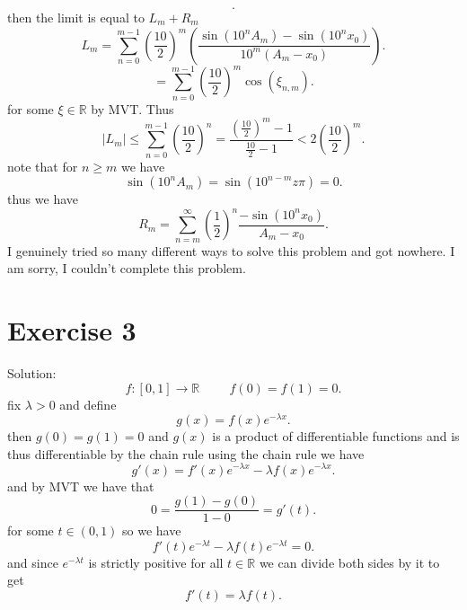 \documentclass[11pt]{article}
\newcommand{\solution}[1]{{{\textcolor{header}{Solution:} \textcolor{solution}{#1}}}}
\begin{document}
{\begin{enumerate}
\[            .\] 
            then the limit is equal to $L_m + R_m$
             \[
            L_m = \sum_{n=0}^{m-1}(\frac{10}{2})^{m}(\frac{\sin(10^{n}A_m)-\sin(10^{n}x_0)}{10^{m}(A_m-x_0)})
            .\] 
            \[
                = \sum_{n=0}^{m-1}(\frac{10}{2})^{m}\cos(\xi_{n,m})
            .\] 
            for some $\xi \in \mathbb{R}$ by MVT.
            Thus
            \[
            |L_m| \le \sum_{n=0}^{m-1}(\frac{10}{2})^{n} = \frac{(\frac{10}{2})^{m}-1}{\frac{10}{2}-1} < 2(\frac{10}{2})^{m}
            .\] 
            note that for $n \ge m$ we have
            \[
            \sin(10^{n}A_m) = \sin(10^{n-m}z\pi) = 0
            .\] 
            thus we have
            \[
            R_m = \sum_{n=m}^{\infty}(\frac{1}{2})^{n}\frac{-\sin(10^{n}x_0)}{A_m-x_0}
            .\] 
            I genuinely tried so many different ways to solve this problem and got nowhere. I am sorry, I couldn't complete this problem.
    \end{enumerate}
}
\section{Exercise 3}
\solution{
    \[
        f: [0,1] \rightarrow \mathbb{R} \hspace{1cm} f(0) = f(1) = 0
    .\] 
    fix $\lambda > 0$ and define
    \[
    g(x) = f(x)e^{-\lambda x}
    .\] 
    then $g(0) = g(1) = 0$ and $g(x)$ is a product of differentiable functions and is thus differentiable by the chain rule
    using the chain rule we have
     \[
    g'(x) = f'(x)e^{-\lambda x} - \lambda f(x) e^{-\lambda x}
    .\] 
    and by MVT we have that
    \[
        0 =\frac{g(1) - g(0)}{1-0} = g'(t)
    .\] 
    for some $t \in (0,1)$ so we have
    \[
    f'(t)e^{-\lambda t} - \lambda f(t) e^{-\lambda t} = 0
    .\] 
    and since $e^{-\lambda t}$ is strictly positive for all $t \in \mathbb{R}$ we can divide both sides by it to get
    \[
    f'(t) = \lambda f(t)
    .\] 
}
\end{document}
